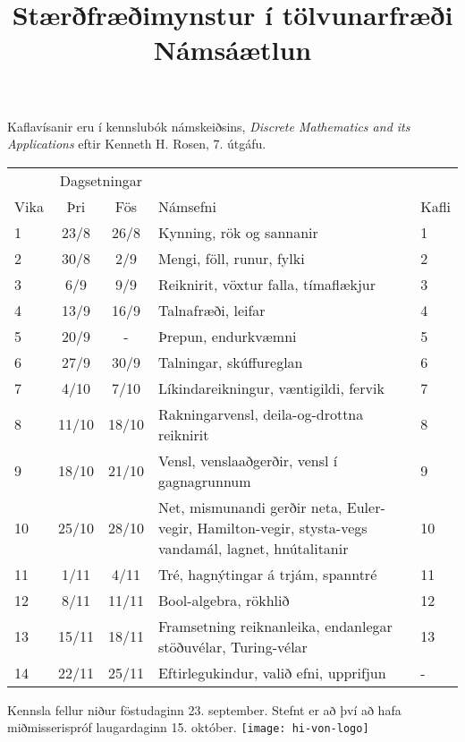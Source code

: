 \documentclass{article}
\title{Stærðfræðimynstur í tölvunarfræði \\ Námsáætlun \semester}
\author{}
\begin{document}
\maketitle
{}

Kaflavísanir eru í kennslubók námskeiðsins, \emph{Discrete Mathematics and its Applications} eftir Kenneth H. Rosen, 7. útgáfu.
\vspace{0.5cm}
\begin{center}
\renewcommand{\arraystretch}{1.2}
\begin{tabularx}{\linewidth}{lccXp{1cm}}
\toprule
&\multicolumn{2}{c}{Dagsetningar}&&\\
\cmidrule{2-3}
Vika&Þri&Fös&Námsefni&Kafli\\
\midrule
1	&23/8	&26/8	& Kynning, rök og sannanir&1\\
2	&30/8	&2/9	& Mengi, föll, runur, fylki&2\\
3	&6/9	&9/9	& Reiknirit, vöxtur falla, tímaflækjur&3\\
4	&13/9	&16/9	& Talnafræði, leifar&4\\
5	&20/9	&-	& Þrepun, endurkvæmni&5\\
6	&27/9	&30/9	& Talningar, skúffureglan &6\\
7	&4/10	&7/10	& Líkindareikningur, væntigildi, fervik&7\\
8	&11/10	&18/10	& Rakningarvensl, deila-og-drottna reiknirit&8\\
9	&18/10	&21/10	& Vensl, venslaaðgerðir, vensl í gagnagrunnum&9\\
10	&25/10	&28/10	& Net, mismunandi gerðir neta, Euler-vegir, Hamilton-vegir, stysta-vegs vandamál, lagnet, hnútalitanir&10\\
11	&1/11	&4/11	& Tré, hagnýtingar á trjám, spanntré&11\\
12	&8/11	&11/11	& Bool-algebra, rökhlið&12\\
13	&15/11	&18/11	& Framsetning reiknanleika, endanlegar stöðuvélar, Turing-vélar&13\\
14	&22/11	&25/11	& Eftirlegukindur, valið efni, upprifjun&-\\
\bottomrule
\end{tabularx}
\end{center}
\vspace{0.5cm}
Kennsla fellur niður föstudaginn 23. september. Stefnt er að því að hafa miðmisserispróf laugardaginn 15. október.
\vfill
\texttt{[image: hi-von-logo]}
\end{document}
